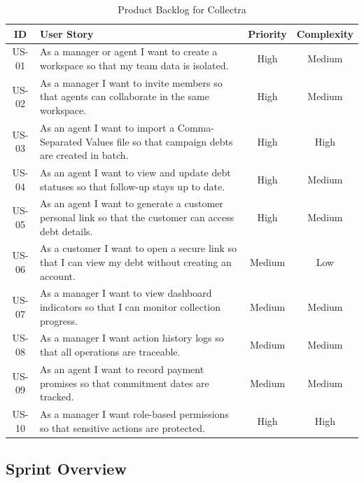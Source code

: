 \documentclass[12pt,a4paper]{report}
\newcommand{\reporttablesetup}{%
  \small%
  \setlength{\tabcolsep}{5pt}%
  \renewcommand{\arraystretch}{1.38}%
  \arrayrulecolor{framegray}%
}
\begin{document}
\begin{table}[H]
  \centering
  \reporttablesetup
  \begin{tabularx}{\textwidth}{|c|Y|c|c|}
    \hline
    \textbf{ID} & \textbf{User Story} & \textbf{Priority} & \textbf{Complexity} \\
    \hline
    US-01 & As a manager or agent I want to create a workspace so that my team data is isolated.                        & High   & Medium \\
    \hline
    US-02 & As a manager I want to invite members so that agents can collaborate in the same workspace.               & High   & Medium \\
    \hline
    US-03 & As an agent I want to import a Comma-Separated Values file so that campaign debts are created in batch.                      & High   & High \\
    \hline
    US-04 & As an agent I want to view and update debt statuses so that follow-up stays up to date.                   & High   & Medium \\
    \hline
    US-05 & As an agent I want to generate a customer personal link so that the customer can access debt details.     & High   & Medium \\
    \hline
    US-06 & As a customer I want to open a secure link so that I can view my debt without creating an account.        & Medium & Low \\
    \hline
    US-07 & As a manager I want to view dashboard indicators so that I can monitor collection progress.               & Medium & Medium \\
    \hline
    US-08 & As a manager I want action history logs so that all operations are traceable.                              & Medium & Medium \\
    \hline
    US-09 & As an agent I want to record payment promises so that commitment dates are tracked.                        & Medium & Medium \\
    \hline
    US-10 & As a manager I want role-based permissions so that sensitive actions are protected.                        & High   & High \\
    \hline
  \end{tabularx}
  \caption{Product Backlog for Collectra}
  \label{tab:backlog}
\end{table}

\subsection{Sprint Overview}
\end{document}
